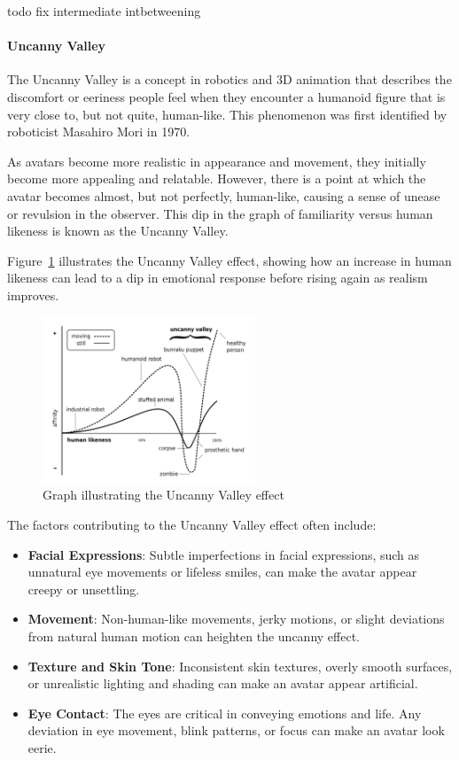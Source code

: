 \documentclass[../../main.tex]{subfiles}
\begin{document}
todo fix intermediate intbetweening

\paragraph{Uncanny Valley}
\label{ch:background_work:sign_language_synthesis:3d_techniques:avatar_animation:uncanny_valley}

The Uncanny Valley is a concept in robotics and 3D animation that describes the discomfort or eeriness people feel when they encounter a humanoid figure that is very close to, but not quite, human-like. This phenomenon was first identified by roboticist Masahiro Mori in 1970.

As avatars become more realistic in appearance and movement, they initially become more appealing and relatable. However, there is a point at which the avatar becomes almost, but not perfectly, human-like, causing a sense of unease or revulsion in the observer. This dip in the graph of familiarity versus human likeness is known as the Uncanny Valley.

Figure~\ref{fig:uncanny_valley_graph} illustrates the Uncanny Valley effect, showing how an increase in human likeness can lead to a dip in emotional response before rising again as realism improves.

\begin{figure}
  \centering
  \includegraphics[width = 2.5in]{chapters/background_work/images/uncanny_valley_graph.png}
  \caption{Graph illustrating the Uncanny Valley effect}
  \label{fig:uncanny_valley_graph}
\end{figure}

The factors contributing to the Uncanny Valley effect often include:

\begin{itemize}
  \item \textbf{Facial Expressions}: Subtle imperfections in facial expressions, such as unnatural eye movements or lifeless smiles, can make the avatar appear creepy or unsettling.
  \item \textbf{Movement}: Non-human-like movements, jerky motions, or slight deviations from natural human motion can heighten the uncanny effect.
  \item \textbf{Texture and Skin Tone}: Inconsistent skin textures, overly smooth surfaces, or unrealistic lighting and shading can make an avatar appear artificial.
  \item \textbf{Eye Contact}: The eyes are critical in conveying emotions and life. Any deviation in eye movement, blink patterns, or focus can make an avatar look eerie.
\end{itemize}
\end{document}
